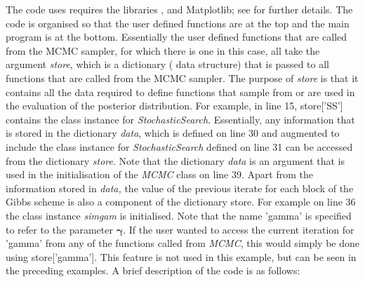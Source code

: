 \documentclass[article]{jss}
\begin{document}
The code uses requires the  libraries ,
 and Matplotlib; see \citet{NumpyScipy,Matplotlib} for
further details. The code is organised so that the user defined
functions are at the top and the main program is at the bottom.
Essentially the user defined functions that are called from the MCMC
sampler, for which there is one in this case, all take the argument
\emph{store}, which is a dictionary ( data structure)
that is passed to all functions that are called from the MCMC sampler.
The purpose of \emph{store} is that it contains all the data required
to define functions that sample from or are used in the evaluation of
the posterior distribution. For example, in line 15, store{[}'SS'{]}
contains the class instance for \emph{StochasticSearch}.  Essentially,
any information that is stored in the dictionary \emph{data}, which is
defined on line 30 and augmented to include the class instance for
\emph{StochasticSearch} defined on line 31 can be accessed from the
dictionary \emph{store}. Note that the dictionary \emph{data} is an
argument that is used in the initialisation of the \emph{MCMC} class
on line 39. Apart from the information stored in \emph{data,} the
value of the previous iterate for each block of the Gibbs scheme is
also a component of the dictionary store. For example on line 36 the
class instance \emph{simgam} is initialised. Note that the name
'gamma' is specified to refer to the parameter $\bm{\gamma}.$ If the
user wanted to access the current iteration for 'gamma' from any of
the functions called from \emph{MCMC}, this would simply be done using
store{[}'gamma'{]}. This feature is not used in this example, but can
be seen in the preceding examples. A brief description of the code is
as follows:
\end{document}
